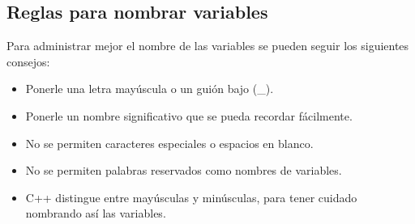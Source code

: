 \subsection{Reglas para nombrar variables}
Para administrar mejor el nombre de las variables se pueden seguir los siguientes consejos:
\begin{itemize}
    \item Ponerle una letra mayúscula o un guión bajo (\_).
    \item Ponerle un nombre significativo que se pueda recordar fácilmente.
    \item No se permiten caracteres especiales o espacios en blanco.
    \item No se permiten palabras reservados como nombres de variables.
    \item C++ distingue entre mayúsculas y minúsculas, para tener cuidado nombrando así las variables.
\end{itemize}



